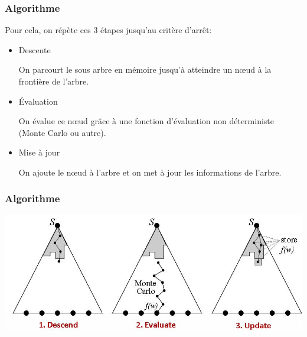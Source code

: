 \documentclass{beamer}
\begin{document}
\begin{frame}
    \frametitle{Algorithme}

    Pour cela, on répète ces 3 étapes jusqu'au critère d'arrêt:
    \begin{itemize}
        \item Descente

            On parcourt le sous arbre en mémoire jusqu'à atteindre un nœud à la frontière de l'arbre.

        \item Évaluation

            On évalue ce nœud grâce à une fonction d'évaluation non déterministe (Monte Carlo ou autre).
        \item Mise à jour

            On ajoute le nœud à l'arbre et on met à jour les informations de l'arbre.
    \end{itemize}


\end{frame}

\begin{frame}
    \frametitle{Algorithme}
    \begin{center}
        \includegraphics[scale=0.5]{3steps.jpg}
    \end{center}


\end{frame}
\end{document}
